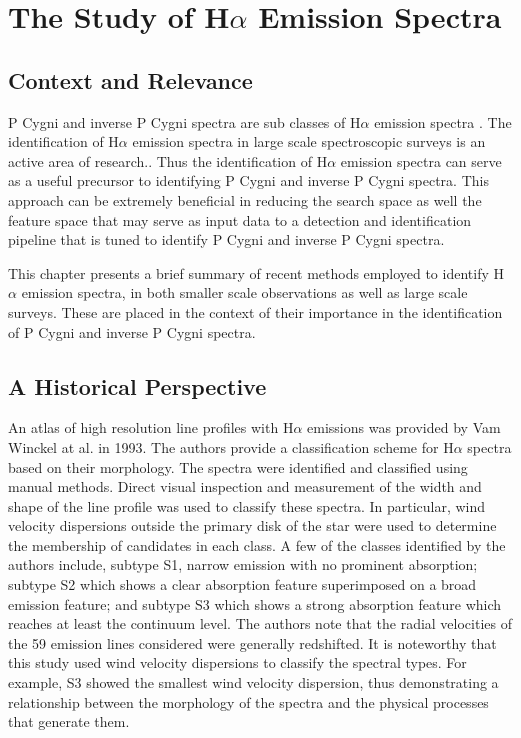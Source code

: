 \chapter{The Study of H$\alpha$ Emission Spectra}

\section{Context and Relevance}
P Cygni and inverse P Cygni spectra are sub classes of H$\alpha$ emission spectra \cite{zhang2021catalog}. The identification of H$\alpha$ emission spectra in large scale spectroscopic surveys is an active area of research.\cite{zhang2021catalog,vcotar2021galah,traven2015gaia}. Thus the identification of H$\alpha$ emission spectra can serve as a useful precursor to identifying P Cygni and inverse P Cygni spectra. This approach can be extremely beneficial in reducing the search space as well the feature space that may serve as input data to a detection and identification pipeline that is tuned to identify P Cygni and inverse P Cygni spectra. 

This chapter presents a brief summary of recent methods employed to identify H$\alpha$ emission spectra, in both smaller scale observations as well as large scale surveys. These are placed in the context of their importance in the identification of P Cygni and inverse P Cygni spectra.

\section{A Historical Perspective}
An atlas of high resolution line profiles with H$\alpha$ emissions was provided by Vam Winckel at al. in 1993\cite{van1993atlas}. The authors provide a classification scheme for H$\alpha$ spectra based on their morphology. The spectra were identified and classified using manual methods. Direct visual inspection and measurement of the width and shape of the line profile was used to classify these spectra. In particular, wind velocity dispersions outside the primary disk of the star were used to determine the membership of candidates in each class.
A few of the classes identified by the authors include, subtype S1, narrow emission with no prominent absorption; subtype S2 which shows a clear absorption feature superimposed on a broad emission feature; and subtype S3 which shows a strong absorption feature which reaches at least the continuum level. The authors note that the radial velocities of the 59 emission lines considered were generally redshifted. It is noteworthy that this study used wind velocity dispersions to classify the spectral types. For example, S3 showed the smallest wind velocity dispersion, thus demonstrating a relationship between the morphology of the spectra and the physical processes that generate them.

